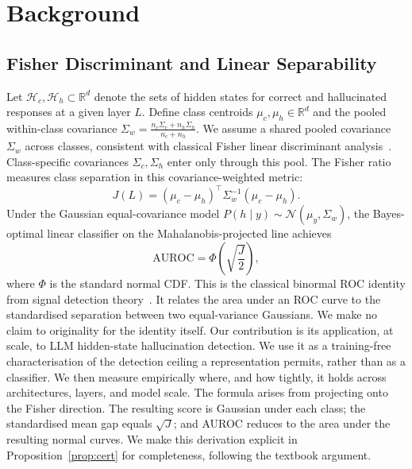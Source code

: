 \documentclass[onecolumn]{jmlr}
\begin{document}
\FloatBarrier
\section{Background}
\label{sec:background}

\subsection{Fisher Discriminant and Linear Separability}
\label{sec:background-fisher}

Let $\mathcal{H}_c, \mathcal{H}_h \subset \mathbb{R}^d$ denote the sets of
hidden states for correct and hallucinated responses at a given layer $L$.
Define class centroids $\mu_c, \mu_h \in \mathbb{R}^d$ and the pooled
within-class covariance
$\Sigma_w = \frac{n_c \Sigma_c + n_h \Sigma_h}{n_c + n_h}.$
We assume a shared pooled covariance $\Sigma_w$ across classes,
consistent with classical Fisher linear discriminant
analysis~\citep{fisher1936use}. Class-specific covariances $\Sigma_c,
\Sigma_h$ enter only through this pool.
The Fisher ratio measures class separation in this covariance-weighted metric:
\begin{equation}
  J(L) = (\mu_c - \mu_h)^\top \Sigma_w^{-1} (\mu_c - \mu_h).
  \label{eq:fisher}
\end{equation}
Under the Gaussian equal-covariance model
$P(h \mid y) \sim \mathcal{N}(\mu_y, \Sigma_w)$,
the Bayes-optimal linear classifier on the Mahalanobis-projected line
achieves
\begin{equation}
  \text{AUROC} = \Phi\!\left(\sqrt{\frac{J}{2}}\right),
  \label{eq:auroc-bound}
\end{equation}
where $\Phi$ is the standard normal CDF. This is the classical binormal
ROC identity from signal detection
theory~\citep{green1966signal,bamber1975area,hanley1982meaning}. It
relates the area under an ROC curve to the standardised separation
between two equal-variance Gaussians. We make no claim to originality
for the identity itself. Our contribution is its application, at scale,
to LLM hidden-state hallucination detection. We use it as a
training-free characterisation of the detection ceiling a
representation permits, rather than as a classifier. We then measure
empirically where, and how tightly, it holds across architectures,
layers, and model scale. The formula arises from projecting onto the
Fisher direction. The resulting score is Gaussian under each class; the
standardised mean gap equals $\sqrt{J}$; and AUROC reduces to the area
under the resulting normal curves. We make this derivation explicit in
Proposition~\ref{prop:cert} for completeness, following the textbook
argument.
\end{document}
